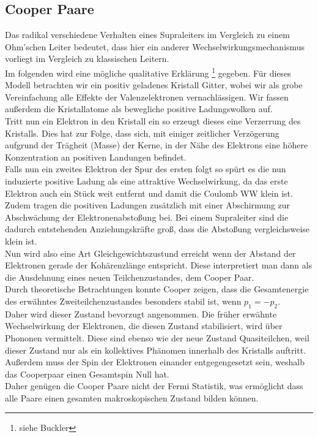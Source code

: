 \documentclass[twoside,        %
               BCOR12mm,       %
               english,ngerman, %
               fleqn,headsepline=false,footsepline=false
              ]{MFPREPORT}
\begin{document}
\subsection{Cooper Paare}
Das radikal verschiedene Verhalten eines Supraleiters im Vergleich zu einem Ohm'schen Leiter bedeutet, dass hier ein anderer Wechselwirkungsmechanismus vorliegt im Vergleich zu klassischen Leitern.
\\
Im folgenden wird eine mögliche qualitative Erklärung
\footnote{siehe Buckler}
gegeben. 
Für dieses Modell betrachten wir ein positiv geladenes Kristall Gitter, wobei wir als grobe Vereinfachung alle Effekte der Valenzelektronen vernachlässigen.
Wir fassen außerdem die Kristallatome als bewegliche positive Ladungswolken auf.
\\
Tritt nun ein Elektron in den Kristall ein so erzeugt dieses eine Verzerrung des Kristalls.
Dies hat zur Folge, dass sich, mit einiger zeitlicher Verzögerung aufgrund der Trägheit (Masse) der Kerne, in der Nähe des Elektrons eine höhere Konzentration an positiven Landungen befindet. 
\\
Falls nun ein zweites Elektron der Spur des ersten folgt so spürt es die nun induzierte positive Ladung als eine attraktive Wechselwirkung, da das erste Elektron auch ein Stück weit entfernt und damit die Coulomb WW klein ist. Zudem tragen die positiven Ladungen zusätzlich mit einer Abschirmung zur Abschwächung der Elektronenabstoßung bei.
Bei einem Supraleiter sind die dadurch entstehenden Anziehungskräfte groß, dass die Abstoßung vergleichsweise klein ist.
\\
Nun wird also eine Art Gleichgewichtszustund erreicht wenn der Abstand der Elektronen gerade der Kohärenzlänge entspricht. 
Diese interpretiert man dann als die Ausdehnung eines neuen Teilchenzustandes, dem Cooper Paar.
\\
Durch theoretische Betrachtungen konnte Cooper zeigen, dass die Gesamtenergie des erwähntes Zweiteilchenzustandes besonders stabil ist, wenn $p_1 = -p_2$. 
\\
Daher wird dieser Zustand bevorzugt angenommen.
Die früher erwähnte Wechselwirkung der Elektronen, die diesen Zustand stabilisiert, wird über Phononen vermittelt.
Diese sind ebenso wie der neue Zustand Quasiteilchen, weil dieser Zustand nur als ein kollektives Phänomen innerhalb des Kristalls auftritt.
Außerdem muss der Spin der Elektronen einander entgegengesetzt sein, weshalb das Cooperpaar einen Gesamtspin Null hat.
\\
Daher genügen die Cooper Paare nicht der Fermi Statistik, was ermöglicht dass alle Paare einen gesamten makroskopischen Zustand bilden können.
\end{document}
